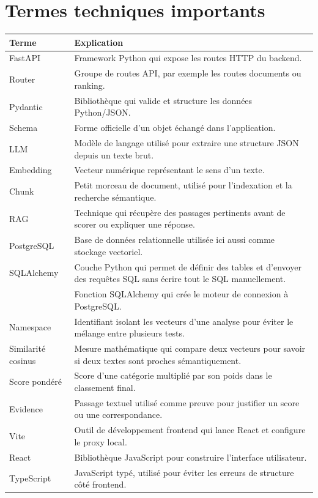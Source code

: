 \documentclass[12pt,a4paper]{article}
\newcommand{\code}[1]{\texttt{\detokenize{#1}}}
\begin{document}
\section{Termes techniques importants}

\begin{longtable}{p{4cm}p{11cm}}
\textbf{Terme} & \textbf{Explication} \\
\hline
FastAPI & Framework Python qui expose les routes HTTP du backend. \\
Router & Groupe de routes API, par exemple les routes documents ou ranking. \\
Pydantic & Bibliothèque qui valide et structure les données Python/JSON. \\
Schema & Forme officielle d'un objet échangé dans l'application. \\
LLM & Modèle de langage utilisé pour extraire une structure JSON depuis un texte brut. \\
Embedding & Vecteur numérique représentant le sens d'un texte. \\
Chunk & Petit morceau de document, utilisé pour l'indexation et la recherche sémantique. \\
RAG & Technique qui récupère des passages pertinents avant de scorer ou expliquer une réponse. \\
PostgreSQL & Base de données relationnelle utilisée ici aussi comme stockage vectoriel. \\
SQLAlchemy & Couche Python qui permet de définir des tables et d'envoyer des requêtes SQL sans écrire tout le SQL manuellement. \\
\code{create_engine} & Fonction SQLAlchemy qui crée le moteur de connexion à PostgreSQL. \\
Namespace & Identifiant isolant les vecteurs d'une analyse pour éviter le mélange entre plusieurs tests. \\
Similarité cosinus & Mesure mathématique qui compare deux vecteurs pour savoir si deux textes sont proches sémantiquement. \\
Score pondéré & Score d'une catégorie multiplié par son poids dans le classement final. \\
Evidence & Passage textuel utilisé comme preuve pour justifier un score ou une correspondance. \\
Vite & Outil de développement frontend qui lance React et configure le proxy local. \\
React & Bibliothèque JavaScript pour construire l'interface utilisateur. \\
TypeScript & JavaScript typé, utilisé pour éviter les erreurs de structure côté frontend. \\
\end{longtable}
\end{document}
